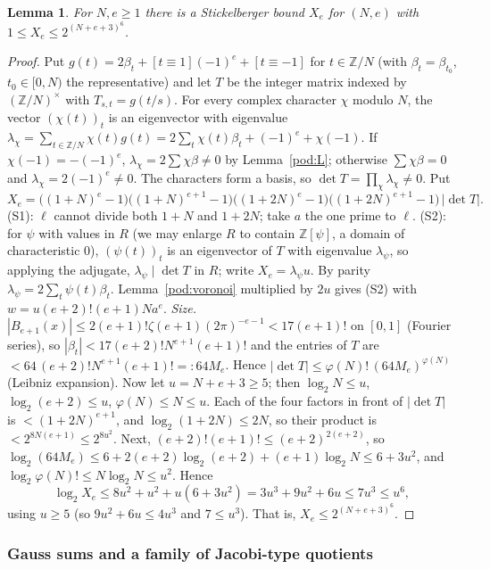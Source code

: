 \documentclass[10pt]{amsart}
\newtheorem{lemma}[theorem]{Lemma}
\theoremstyle{definition}
\theoremstyle{remark}
\newcommand{\Z}{\mathbb Z}
\begin{document}
\begin{lemma}\label{pod:X}
For $N,e\ge1$ there is a Stickelberger bound $X_e$ for $(N,e)$ with $1\le X_e\le2^{(N+e+3)^6}$.
\end{lemma}
\begin{proof}
Put $g(t)=2\beta_t+[t\equiv1](-1)^e+[t\equiv-1]$ for $t\in\Z/N$ (with $\beta_t=\beta_{t_0}$,
$t_0\in[0,N)$ the representative) and let $T$ be the integer matrix indexed by
$(\Z/N)^\times$ with $T_{s,t}=g(t/s)$. For every complex character $\chi$ modulo $N$, the vector
$(\chi(t))_t$ is an eigenvector with eigenvalue $\lambda_\chi=\sum_{t\in\Z/N}\chi(t)g(t)=
2\sum_t\chi(t)\beta_t+(-1)^e+\chi(-1)$. If $\chi(-1)=-(-1)^e$, $\lambda_\chi=2\sum\chi\beta\ne0$ by
Lemma~\ref{pod:L}; otherwise $\sum\chi\beta=0$ and $\lambda_\chi=2(-1)^e\ne0$. The characters form a
basis, so $\det T=\prod_\chi\lambda_\chi\ne0$. Put
\[
X_e=\bigl((1+N)^e-1\bigr)\bigl((1+N)^{e+1}-1\bigr)\bigl((1+2N)^e-1\bigr)\bigl((1+2N)^{e+1}-1\bigr)\,
|\det T|.
\]
(S1): $\ell$ cannot divide both $1+N$ and $1+2N$; take $a$ the one prime to $\ell$.
(S2): for $\psi$ with values in $R$ (we may enlarge $R$ to contain $\Z[\psi]$, a domain of
characteristic $0$), $(\psi(t))_t$ is an eigenvector of $T$ with eigenvalue $\lambda_\psi$, so applying
the adjugate, $\lambda_\psi\mid\det T$ in $R$; write $X_e=\lambda_\psi u$. By parity $\lambda_\psi=
2\sum_t\psi(t)\beta_t$. Lemma~\ref{pod:voronoi} multiplied by $2u$ gives (S2) with $w=u(e+2)!(e+1)Na^e$.
\emph{Size.} $|B_{e+1}(x)|\le2(e+1)!\zeta(e+1)(2\pi)^{-e-1}<17(e+1)!$ on $[0,1]$ (Fourier series), so
$|\beta_t|<17(e+2)!N^{e+1}(e+1)!$ and the entries of $T$ are $<64\,(e+2)!N^{e+1}(e+1)!=:64M_e$. Hence
$|\det T|\le\varphi(N)!\,(64M_e)^{\varphi(N)}$ (Leibniz expansion).
Now let $u=N+e+3\ge5$; then $\log_2N\le u$, $\log_2(e+2)\le u$, $\varphi(N)\le N\le u$. Each of the
four factors in front of $|\det T|$ is $<(1+2N)^{e+1}$, and $\log_2(1+2N)\le2N$, so their product is
$<2^{8N(e+1)}\le2^{8u^2}$. Next, $(e+2)!(e+1)!\le(e+2)^{2(e+2)}$, so $\log_2(64M_e)\le6+2(e+2)
\log_2(e+2)+(e+1)\log_2N\le6+3u^2$, and $\log_2\varphi(N)!\le N\log_2N\le u^2$. Hence
\[
\log_2X_e\le8u^2+u^2+u(6+3u^2)=3u^3+9u^2+6u\le7u^3\le u^6 ,
\]
using $u\ge5$ (so $9u^2+6u\le4u^3$ and $7\le u^3$). That is, $X_e\le2^{(N+e+3)^6}$.
\end{proof}

\subsubsection{Gauss sums and a family of Jacobi-type quotients}\label{pod:ss-gauss}
\end{document}
